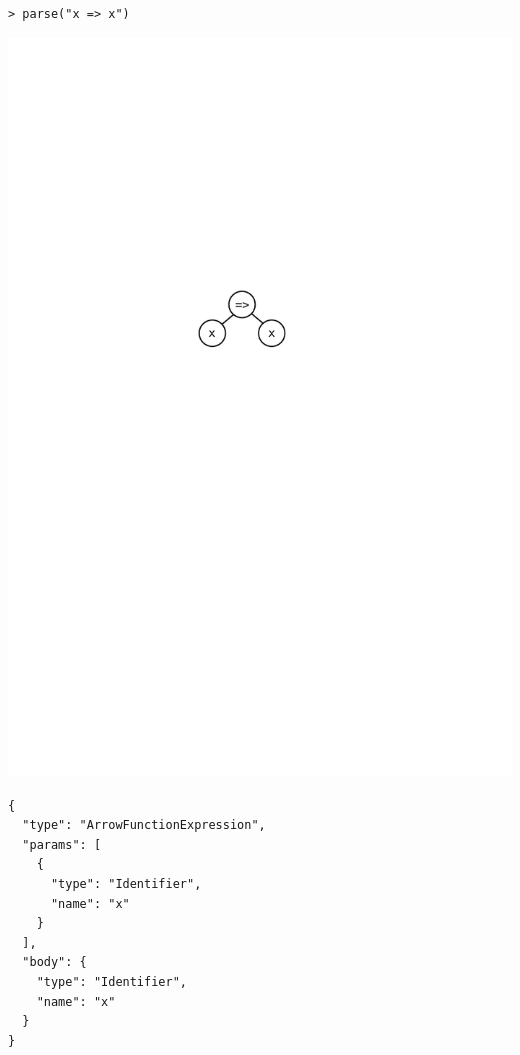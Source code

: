 \documentclass[12pt, oneside]{book}
\begin{document}
\begin{verbatim}
> parse("x => x")
\end{verbatim}
\includegraphics{images/data-structures-to-represent-yocto-javascript-programs/function.pdf}
\begin{verbatim}
{
  "type": "ArrowFunctionExpression",
  "params": [
    {
      "type": "Identifier",
      "name": "x"
    }
  ],
  "body": {
    "type": "Identifier",
    "name": "x"
  }
}
\end{verbatim}
\end{document}
